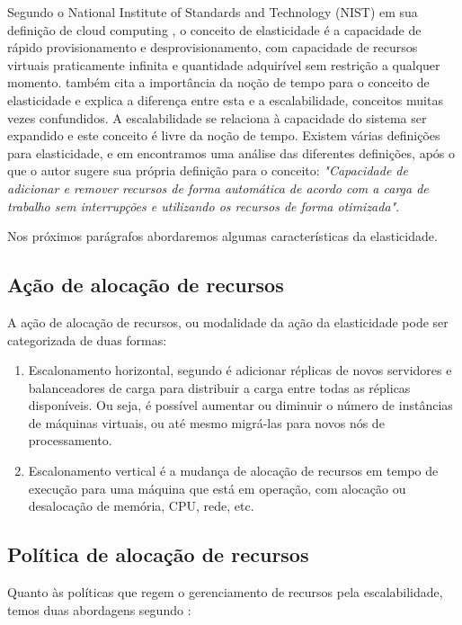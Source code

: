 \documentclass[twoside,english,brazilian]{UNISINOSmonografia}
\begin{document}
Segundo o National Institute of Standards and Technology (NIST) em sua definição de cloud computing \cite{Mell2012}, o conceito de elasticidade é a capacidade de rápido provisionamento e desprovisionamento, com capacidade de recursos virtuais praticamente infinita e quantidade adquirível sem restrição a qualquer momento. \citep{Righi2013} também cita a importância da noção de tempo para o conceito de elasticidade e explica a diferença entre esta e a escalabilidade, conceitos muitas vezes confundidos. A escalabilidade se relaciona à capacidade do sistema ser expandido e este conceito é livre da noção de tempo.
Existem várias definições para elasticidade, e em \cite{Coutinho} encontramos uma análise das diferentes definições, após o que o autor sugere sua própria definição para o conceito: \textit{"Capacidade de adicionar e remover recursos de forma automática de acordo com a carga de trabalho sem interrupções e utilizando os recursos de forma otimizada"}.

Nos próximos parágrafos abordaremos algumas características da elasticidade.

\subsection{Ação de alocação de recursos}
A ação de alocação de recursos, ou modalidade da ação da elasticidade pode ser categorizada de duas formas: 

\begin{enumerate}
	\item Escalonamento horizontal, segundo \cite{Lorido-botr2012} é adicionar réplicas de novos servidores e balanceadores de carga para distribuir a carga entre todas as réplicas disponíveis. Ou seja, é possível aumentar ou diminuir o número de instâncias de máquinas virtuais, ou até mesmo migrá-las para novos nós de processamento.
	\item Escalonamento vertical é a mudança de alocação de recursos em tempo de execução para uma máquina que está em operação, com alocação ou desalocação de memória, CPU, rede, etc.
\end{enumerate}

\subsection{Política de alocação de recursos}
Quanto às políticas que regem o gerenciamento de recursos pela escalabilidade, temos duas abordagens segundo \cite{Galante2012}:
\end{document}
